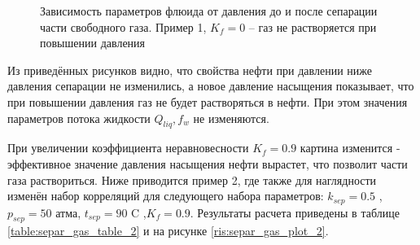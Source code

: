 \begin{figure}[H]
\caption{Зависимость параметров флюида от давления до и после сепарации части свободного газа. Пример 1, $K_f=0$ -- газ не растворяется при повышении давления}
\label{ris:separ_gas_plot_1}
\end{figure}

Из приведённых рисунков видно, что свойства нефти при давлении ниже давления сепарации не изменились, а новое давление насыщения показывает, что при повышении давления газ не будет растворяться в нефти. При этом значения параметров потока жидкости $Q_{liq}, f_w$ не изменяются.

При увеличении коэффициента неравновесности $K_f=0.9$ картина изменится - эффективное значение давления насыщения нефти вырастет, что позволит части газа раствориться. Ниже приводится пример 2, где также для наглядности изменён набор корреляций для следующего набора параметров: $k_{sep} = 0.5$ ,$p_{sep} = 50$   атма,	$t_{sep} = 90$   C ,$K_f = 0.9 $. Результаты расчета приведены в таблице \ref{table:separ_gas_table_2} и на   рисунке \ref{ris:separ_gas_plot_2}.

